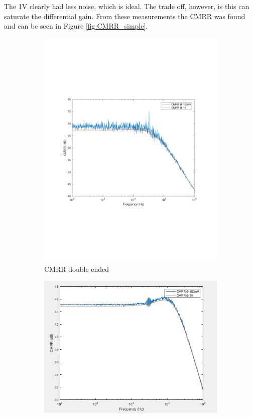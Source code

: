 The 1V clearly had less noise, which is ideal. The trade off, however, is this can saturate the differential gain. From these measurements the CMRR was found and can be seen in Figure \ref{fig:CMRR_simple}.


\begin{figure}[H]
    \centering
    \begin{subfigure}[b]{0.45\textwidth}
        \centering
        \includegraphics[width=\textwidth]{ExperimentalImplementation/CMRR_resist_simple_double.pdf}
        \caption{CMRR double ended}
        \label{fig:blue_led}
    \end{subfigure}
    \hfill
    \begin{subfigure}[b]{0.45\textwidth}
        \centering
        \includegraphics[width=\textwidth]{ExperimentalImplementation/resistive_single_CMRR_simple.png}

\end{subfigure}
\end{figure}
